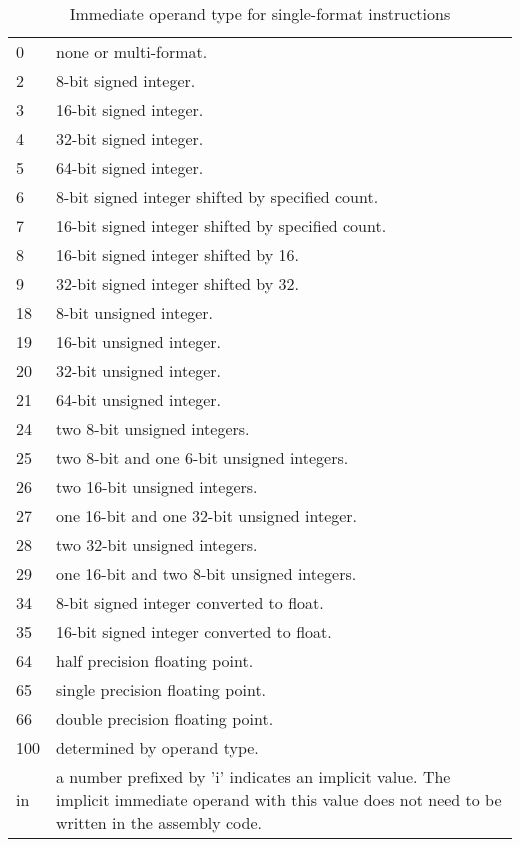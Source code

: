 \documentclass[forwardcom.tex]{subfiles}
\begin{document}
\begin{longtable} {|p{18mm}|p{100mm}|}
\caption{
Immediate operand type for single-format instructions} 
\label{table:immediateOperantTypesInInstructionList}
\\
\endfirsthead
\endhead
\hline
0 & none or multi-format. \\
2 & 8-bit signed integer. \\
3 & 16-bit signed integer. \\
4 & 32-bit signed integer. \\
5 & 64-bit signed integer. \\
6 & 8-bit signed integer shifted by specified count. \\
7 & 16-bit signed integer shifted by specified count. \\
8 & 16-bit signed integer shifted by 16. \\
9 & 32-bit signed integer shifted by 32. \\
18 & 8-bit unsigned integer. \\
19 & 16-bit unsigned integer. \\
20 & 32-bit unsigned integer. \\
21 & 64-bit unsigned integer. \\
24 & two 8-bit unsigned integers. \\
25 & two 8-bit and one 6-bit unsigned integers. \\
26 & two 16-bit unsigned integers. \\
27 & one 16-bit and one 32-bit unsigned integer. \\
28 & two 32-bit unsigned integers. \\
29 & one 16-bit and two 8-bit unsigned integers. \\
34 & 8-bit signed integer converted to float. \\
35 & 16-bit signed integer converted to float. \\
64 & half precision floating point. \\
65 & single precision floating point. \\
66 & double precision floating point. \\
100 & determined by operand type. \\
in & a number prefixed by 'i' indicates an implicit value. 
The implicit immediate operand with this value does not need to be written in the assembly code. \\
\hline
\end{longtable}
\end{document}
